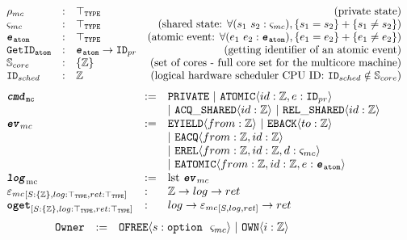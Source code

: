 \begin{figure}
\noindent{}
$$
\begin{array}{lllr}
\privatestate &:& \toptype & \mbox{(private state)}\\
\sharedpiece &:& \toptype  & \mbox{(shared state: }\forall (s_1 \ s_2: \sharedpiece), \set{s_1 = s_2} + \set{s_1 \neq s_2}\mbox{)} \\
\atomicevent &:& \toptype & \mbox{(atomic event: }\forall (e_1 \ e_2: \atomicevent), \set{e_1 = e_2} + \set{e_1 \neq e_2}\mbox{)} \\
\atomiceventidentkwd & : & \atomicevent \rightarrow \primitiveid  & \mbox{(getting identifier of an atomic event)} \\
\coreset & : & \set{\ztype} & \mbox{(set of cores - full core set for the multicore machine)}\\
\schedid & : & \ztype & \mbox{(logical hardware scheduler CPU ID: } \schedid \notin \coreset\mbox{)}\\
\end{array}
$$
$$
\begin{array}{lll}
\command &:=& \privatecmdkwd ~\vert~ \atomiccmdkwd\langle id : \ztype, e:\primitiveid\rangle\\
&& \vert~ \acqsharedcmdkwd\langle id : \ztype\rangle~\vert~\relsharedcmdkwd\langle id : \ztype\rangle\\
\mcevent &:=& \yieldevkwd\langle from : \ztype\rangle~\vert~ \yieldbackevkwd\langle to : \ztype\rangle\\
&& \vert~ \acqevkwd\langle from : \ztype, id : \ztype\rangle\\
&& \vert~\relevkwd\langle from :\ztype, id : \ztype, d:\sharedpiece\rangle\\
&&\vert~\atomicevkwd\langle from : \ztype, id : \ztype, e:\atomicevent\rangle\\
\mclog & := & \listconstructorkwd\ \mcevent\\
\mcoracle{S : \set{\ztype}}{log : \toptype}{ret: \toptype} & : &  \ztype \rightarrow log \rightarrow ret \\
\ogetkwd_{[S: \set{\ztype}, log : \toptype, ret : \toptype]} & : &   log \rightarrow \mcoracle{S}{log}{ret} \rightarrow ret \\
\end{array}
$$
\noindent{}
$$
\begin{array}{llll}
\ownstatekwd & := & \ofreekwd\langle s : \optioncmd~\sharedpiece\rangle~\vert~\ownkwd\langle i : \ztype\rangle \\

\end{array}$$
\end{figure}
